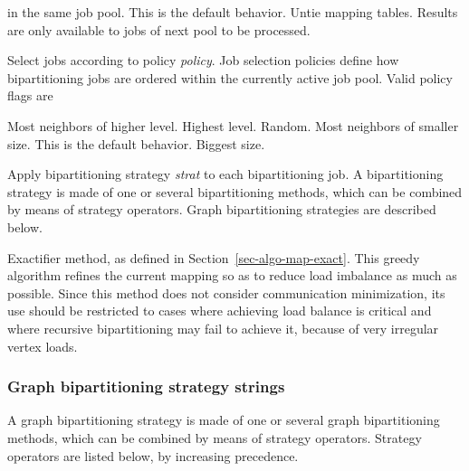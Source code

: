 \begin{itemize}
\begin{itemize}
\begin{itemize}
in the same job pool. This is the default behavior.
\iteme[{\tt u}]
Untie mapping tables. Results are only available to jobs of next pool to be
processed.
\end{itemize}
\iteme[{\tt poli=}{\it policy}]
Select jobs according to policy {\it policy}. Job selection policies
define how bipartitioning jobs are ordered within the currently active job
pool. Valid policy flags are
\begin{itemize}
\iteme[{\tt L}]
Most neighbors of higher level.
\iteme[{\tt l}]
Highest level.
\iteme[{\tt r}]
Random.
\iteme[{\tt S}]
Most neighbors of smaller size. This is the default behavior.
\iteme[{\tt s}]
Biggest size.
\end{itemize}
\iteme[{\tt sep=}{\it strat}]
Apply bipartitioning strategy {\it strat\/} to each bipartitioning job.
A bipartitioning strategy is made of one or several bipartitioning methods,
which can be combined by means of strategy operators. Graph
bipartitioning strategies are described below.
\end{itemize}
\iteme[{\tt x}]
Exactifier method, as defined in Section~\ref{sec-algo-map-exact}.
This greedy algorithm refines the current mapping so as to reduce load
imbalance as much as possible. Since this method does not consider
communication minimization, its use should be restricted to cases
where achieving load balance is critical and where recursive
bipartitioning may fail to achieve it, because of very irregular
vertex loads.
\end{itemize}

\subsubsection{Graph bipartitioning strategy strings}
\label{sec-lib-format-strat-bipart}

A graph bipartitioning strategy is made of one or several graph
bipartitioning methods, which can be combined by means of strategy
operators. Strategy operators are listed below, by increasing
precedence.

